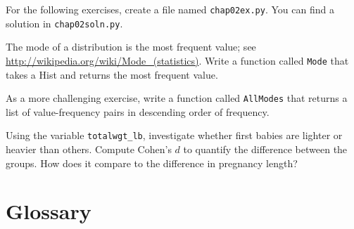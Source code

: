 For the following exercises, create a file named {\tt chap02ex.py}.
You can find a solution in \verb"chap02soln.py".

\begin{exercise}
The mode of a distribution is the most frequent value; see
\url{http://wikipedia.org/wiki/Mode_(statistics)}.  Write a function
called {\tt Mode} that takes a Hist and returns the most
frequent value.

As a more challenging exercise, write a function called {\tt AllModes}
that returns a list of value-frequency pairs in descending order of
frequency.
\end{exercise}

\begin{exercise}
Using the variable \verb"totalwgt_lb", investigate whether first
babies are lighter or heavier than others.  Compute Cohen's $d$
to quantify the difference between the groups.  How does it
compare to the difference in pregnancy length?
\end{exercise}


\section{Glossary}

